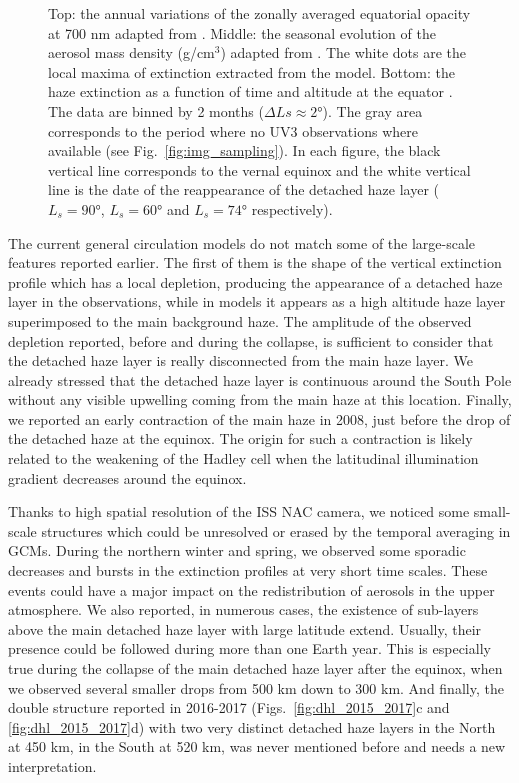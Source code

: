 \begin{figure}[!ht]
\caption{Top: the annual variations of the zonally averaged equatorial opacity at 700 nm adapted
from \cite{Lebonnois2012}.
Middle: the seasonal evolution of the aerosol mass density (g/cm$^3$) adapted from \cite{Larson2015}.
The white dots are the local maxima of extinction extracted from the model.
Bottom: the haze extinction as a function of time and altitude at the equator \citep[completed since][]{West2018}.
The data are binned by 2 months ($\Delta Ls \approx \ang{2} $). The gray area corresponds to the period where
no UV3 observations where available (see Fig.~\ref{fig:img_sampling}).
In each figure, the black vertical line corresponds to the vernal equinox and the white vertical
line is the date of the reappearance of the detached haze layer ($L_s = \ang{90}$, $L_s = \ang{60}$
and $L_s = \ang{74}$ respectively).}
\label{fig:gcm_cycle}
\end{figure}

The current general circulation models do not match some of the large-scale features reported earlier. The first of them
is the shape of the vertical extinction profile which has a local depletion, producing the appearance of a detached haze layer in the
observations, while in models it appears as a high altitude haze layer superimposed to the main background haze.
The amplitude of the observed depletion reported, before and during the collapse, is sufficient to consider that the
detached haze layer is really disconnected from the main haze layer. We already stressed that the detached haze layer is
continuous around the South Pole without any visible upwelling coming from the main haze at this location. Finally, we
reported an early contraction of the main haze in 2008, just before the drop of the detached haze at the equinox. The origin
for such a contraction is likely related to the weakening of the Hadley cell when the latitudinal illumination gradient
decreases around the equinox.

Thanks to high spatial resolution of the ISS NAC camera, we noticed some small-scale structures which could be unresolved or
erased by the temporal averaging in GCMs. During the northern winter and spring, we observed some sporadic decreases and
bursts in the extinction profiles at very short time scales. These events could have a major impact on the redistribution of
aerosols in the upper atmosphere. We also reported, in numerous cases, the existence of sub-layers above the main detached
haze layer with large latitude extend. Usually, their presence could be followed during more than one Earth year. This is
especially true during the collapse of the main detached haze layer after the equinox, when we observed several smaller
drops from 500 km down to 300 km. And finally, the double structure reported in 2016-2017
(Figs.~\ref{fig:dhl_2015_2017}c and \ref{fig:dhl_2015_2017}d) with two very distinct detached haze layers in the
North at 450 km, in the South at 520 km, was never mentioned before and needs a new interpretation.

